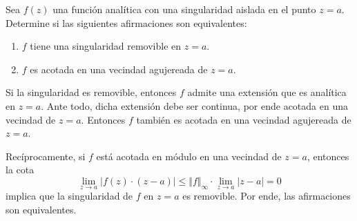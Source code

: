 \begin{exercise}
Sea $f(z)$ una función analítica con una singularidad aislada en el punto $z = a$. Determine si las siguientes afirmaciones son equivalentes:
\begin{enumerate}[label=(\alph*)]
    \item $f$ tiene una singularidad removible en $z = a$.
    \item $f$ es acotada en una vecindad agujereada de $z = a$.
\end{enumerate}
\end{exercise}

\begin{solution}
Si la singularidad es removible, entonces $f$ admite una extensión que es analítica en $z = a$. Ante todo, dicha extensión debe ser continua, por ende acotada en una vecindad de $z = a$. Entonces $f$ también es acotada en una vecindad agujereada de $z = a$.

Recíprocamente, si $f$ está acotada en módulo en una vecindad de $z = a$, entonces la cota
$$\lim_{z \to a} |f(z) \cdot (z - a)| \le \Vert f \Vert_\infty \cdot\lim_{z \to a} |z - a| = 0$$
implica que la singularidad de $f$ en $z = a$ es removible. Por ende, las afirmaciones son equivalentes.
\end{solution}
